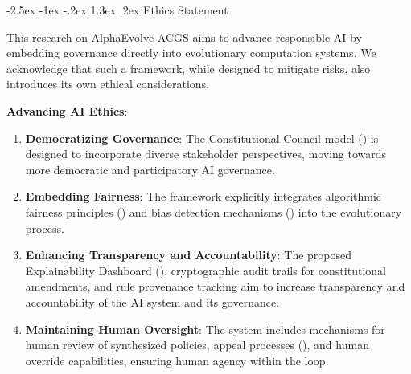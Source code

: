 \documentclass[manuscript,screen,review,anonymous,9pt]{acmart}
\makeatletter
\renewcommand\section{\@startsection{section}{1}{\z@}%
  {-2.5ex \@plus -1ex \@minus -.2ex}%
  {1.3ex \@plus.2ex}%
  {\normalfont\Large\bfseries}}
\makeatother
\begin{document}
\section{Ethics Statement}
\label{sec:ethics}

This research on AlphaEvolve-ACGS aims to advance responsible AI by embedding governance directly into evolutionary computation systems. We acknowledge that such a framework, while designed to mitigate risks, also introduces its own ethical considerations.

\textbf{Advancing AI Ethics}:
\begin{enumerate}
	\item \textbf{Democratizing Governance}: The Constitutional Council model () is designed to incorporate diverse stakeholder perspectives, moving towards more democratic and participatory AI governance.
	\item \textbf{Embedding Fairness}: The framework explicitly integrates algorithmic fairness principles () and bias detection mechanisms () into the evolutionary process.
	\item \textbf{Enhancing Transparency and Accountability}: The proposed Explainability Dashboard (), cryptographic audit trails for constitutional amendments, and rule provenance tracking aim to increase transparency and accountability of the AI system and its governance.
	\item \textbf{Maintaining Human Oversight}: The system includes mechanisms for human review of synthesized policies, appeal processes (), and human override capabilities, ensuring human agency within the loop.
\end{enumerate}
\end{document}
